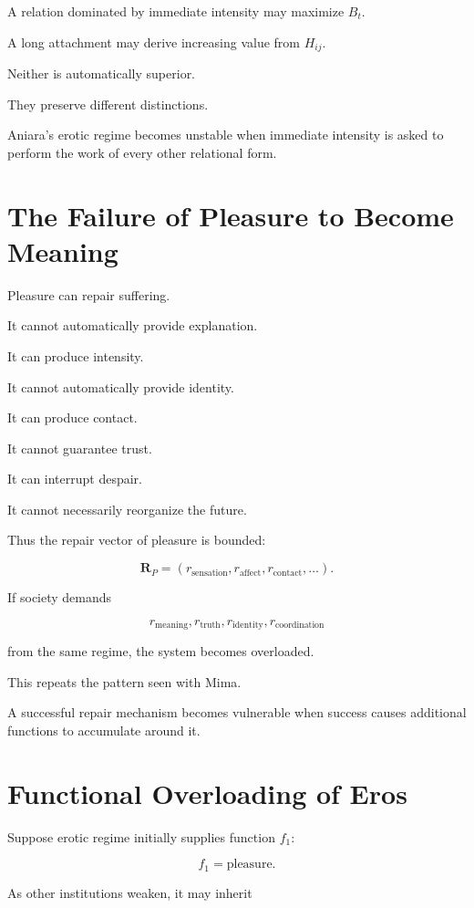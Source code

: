 \documentclass[11pt,oneside]{book}
\theoremstyle{definition}
\theoremstyle{remark}
\begin{document}
A relation dominated by immediate intensity may maximize \(B_t\).

A long attachment may derive increasing value from \(H_{ij}\).

Neither is automatically superior.

They preserve different distinctions.

Aniara's erotic regime becomes unstable when immediate intensity is asked to perform the work of every other relational form.

\section{The Failure of Pleasure to Become Meaning}

Pleasure can repair suffering.

It cannot automatically provide explanation.

It can produce intensity.

It cannot automatically provide identity.

It can produce contact.

It cannot guarantee trust.

It can interrupt despair.

It cannot necessarily reorganize the future.

Thus the repair vector of pleasure is bounded:

\[
\mathbf R_P
=
(
r_{\mathrm{sensation}},
r_{\mathrm{affect}},
r_{\mathrm{contact}},
\ldots
).
\]

If society demands

\[
r_{\mathrm{meaning}},
r_{\mathrm{truth}},
r_{\mathrm{identity}},
r_{\mathrm{coordination}}
\]

from the same regime, the system becomes overloaded.

This repeats the pattern seen with Mima.

A successful repair mechanism becomes vulnerable when success causes additional functions to accumulate around it.

\section{Functional Overloading of Eros}

Suppose erotic regime initially supplies function \(f_1\):

\[
f_1=\text{pleasure}.
\]

As other institutions weaken, it may inherit
\end{document}

